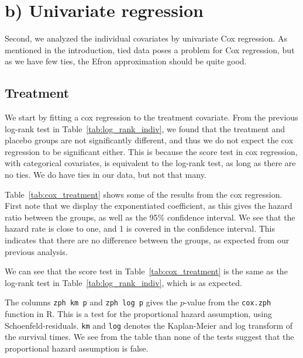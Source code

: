 \documentclass[11pt,a4paper]{article}
\begin{document}
\section{b) Univariate regression}

Second, we analyzed the individual covariates by univariate Cox regression.
As mentioned in the introduction, tied data poses a problem for Cox regression, but as we have few ties, the Efron approximation should be quite good.

\subsection{Treatment}

We start by fitting a cox regression to the treatment covariate. From the previous log-rank test in Table~\ref{tab:log_rank_indiv}, we found that the treatment and placebo groups are not significantly different, and thus we do not expect the cox regression to be significant either. This is because the score test in cox regression, with categorical covariates, is equivalent to the log-rank test, as long as there are no ties. We do have ties in our data, but not that many.

Table~\ref{tab:cox_treatment} shows some of the results from the cox regression. First note that we display the exponentiated coefficient, as this gives the hazard ratio between the groups, as well as the 95\% confidence interval. We see that the hazard rate is close to one, and 1 is covered in the confidence interval. This indicates that there are no difference between the groups, as expected from our previous analysis.

We can see that the score test in Table~\ref{tab:cox_treatment} is the same as the log-rank test in Table~\ref{tab:log_rank_indiv}, which is as expected.

The columns \verb+zph km p+ and \verb+zph log p+ gives the $p$-value from the \verb+cox.zph+ function in R. This is a test for the proportional hazard assumption, using Schoenfeld-residuals. \verb+km+ and \verb+log+ denotes the Kaplan-Meier and log transform of the survival times. We see from the table than none of the tests suggest that the proportional hazard assumption is false.
\end{document}
